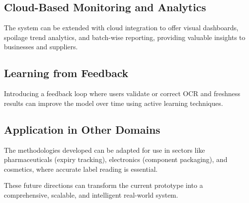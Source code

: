 \documentclass[12pt]{report}
\begin{document}
\subsection{Cloud-Based Monitoring and Analytics}
The system can be extended with cloud integration to offer visual dashboards, spoilage trend analytics, and batch-wise reporting, providing valuable insights to businesses and suppliers.

\subsection{Learning from Feedback}
Introducing a feedback loop where users validate or correct OCR and freshness results can improve the model over time using active learning techniques.

\subsection{Application in Other Domains}
The methodologies developed can be adapted for use in sectors like pharmaceuticals (expiry tracking), electronics (component packaging), and cosmetics, where accurate label reading is essential.

These future directions can transform the current prototype into a comprehensive, scalable, and intelligent real-world system.


\newpage
\end{document}
